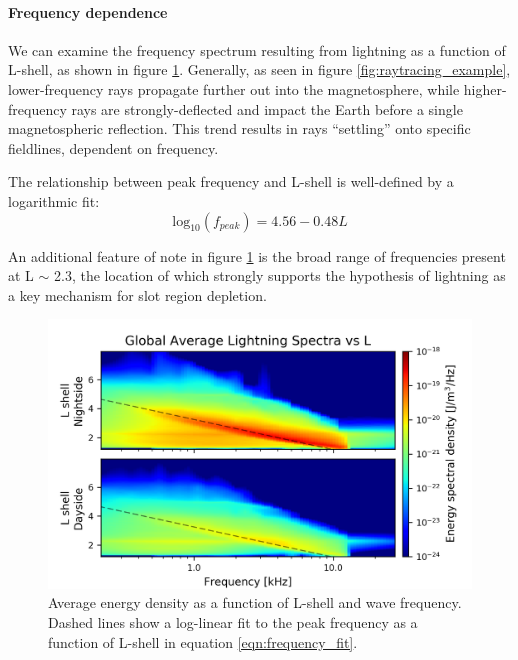\paragraph{Frequency dependence}
We can examine the frequency spectrum resulting from lightning as a function of L-shell, as shown in figure \ref{fig:energy_density_vs_L_vs_freq}. Generally, as seen in figure \ref{fig:raytracing_example}, lower-frequency rays propagate further out into the magnetosphere, while higher-frequency rays are strongly-deflected and impact the Earth before a single magnetospheric reflection. This trend results in rays ``settling'' onto specific fieldlines, dependent on frequency.

The relationship between peak frequency and L-shell is well-defined by a logarithmic fit:
\begin{equation}
\label{eqn:frequency_fit}
\mathrm{log}_{10}(f_{peak}) = 4.56 - 0.48 L
\end{equation}

An additional feature of note in figure \ref{fig:energy_density_vs_L_vs_freq} is the broad range of frequencies present at L $\sim$ 2.3, the location of which strongly supports the hypothesis of lightning as a key mechanism for slot region depletion. 
\begin{figure}[hb]
\begin{center}
\includegraphics{figures/lightning_spectra_vs_L_logscale.png}
\caption[Average energy density vs L and frequency]{Average energy density as a function of L-shell and wave frequency. Dashed lines show a log-linear fit to the peak frequency as a function of L-shell in equation \eqref{eqn:frequency_fit}.}
\label{fig:energy_density_vs_L_vs_freq}
\end{center}
\end{figure}
